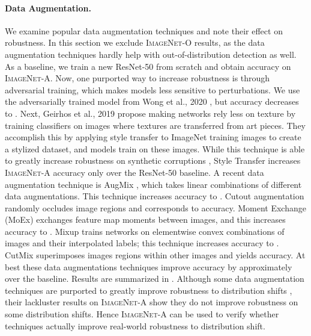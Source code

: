 \documentclass[10pt,twocolumn,letterpaper]{article}
\begin{document}
\paragraph{Data Augmentation.}
We examine popular data augmentation techniques and note their effect on robustness. In this section we exclude \textsc{ImageNet-O} results, as the data augmentation techniques hardly help with out-of-distribution detection as well.
As a baseline, we train a new ResNet-50 from scratch and obtain  accuracy on \textsc{ImageNet-A}.
Now, one purported way to increase robustness is through adversarial training, which makes models less sensitive to  perturbations. We use the adversarially trained model from Wong et al., 2020 \cite{wong2020fast}, but accuracy decreases to . Next, Geirhos et al., 2019 \cite{geirhos2019} propose making networks rely less on texture by training classifiers on images where textures are transferred from art pieces. They accomplish this by applying style transfer to ImageNet training images to create a stylized dataset, and models train on these images. While this technique is able to greatly increase robustness on synthetic corruptions \cite{hendrycks2019robustness}, Style Transfer increases \textsc{ImageNet-A} accuracy only  over the ResNet-50 baseline. A recent data augmentation technique is AugMix \cite{hendrycks2019augmix}, which takes linear combinations of different data augmentations. This technique increases accuracy to . Cutout augmentation \cite{Devries2017ImprovedRO} randomly occludes image regions and corresponds to  accuracy. Moment Exchange (MoEx) \cite{Li2020OnFN} exchanges feature map moments between images, and this increases accuracy to . Mixup \cite{Zhang2018mixupBE} trains networks on elementwise convex combinations of images and their interpolated labels; this technique increases accuracy to . CutMix \cite{Yun2019CutMixRS} superimposes images regions within other images and yields  accuracy. At best these data augmentations techniques improve accuracy by approximately  over the baseline. Results are summarized in . Although some data augmentation techniques are purported to greatly improve robustness to distribution shifts \cite{hendrycks2019augmix,Yin2019AFP}, their lackluster results on \textsc{ImageNet-A} show they do not improve robustness on some distribution shifts. Hence \textsc{ImageNet-A} can be used to verify whether techniques actually improve real-world robustness to distribution shift.
\end{document}
